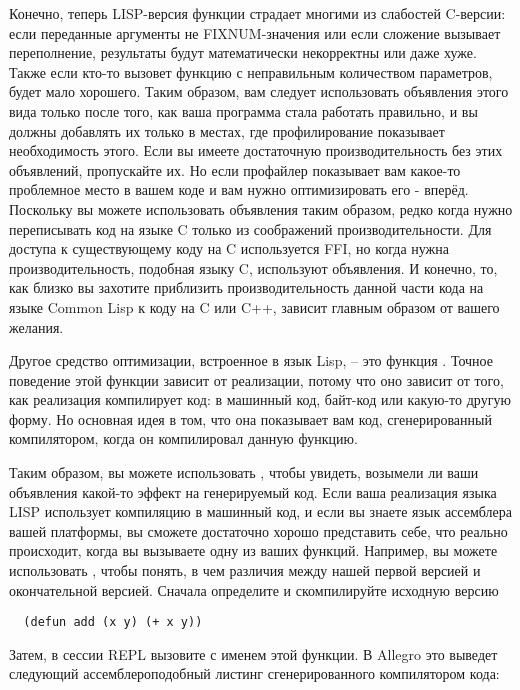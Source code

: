 Конечно, теперь LISP-версия функции страдает многими из слабостей C-версии: если
переданные аргументы не FIXNUM-значения или если сложение вызывает переполнение,
результаты будут математически некорректны или даже хуже. Также если кто-то вызовет
функцию  с неправильным количеством параметров, будет мало хорошего. Таким
образом, вам следует использовать объявления этого вида только после того, как ваша
программа стала работать правильно, и вы должны добавлять их только в местах, где
профилирование показывает необходимость этого. Если вы имеете достаточную
производительность без этих объявлений, пропускайте их. Но если профайлер показывает вам
какое-то проблемное место в вашем коде и вам нужно оптимизировать его - вперёд. Поскольку
вы можете использовать объявления таким образом, редко когда нужно переписывать код на
языке C только из соображений производительности. Для доступа к существующему коду на C
используется FFI, но когда нужна производительность, подобная языку C, используют
объявления. И конечно, то, как близко вы захотите приблизить производительность данной
части кода на языке Common Lisp к коду на C или C++, зависит главным образом от вашего
желания.

Другое средство оптимизации, встроенное в язык Lisp, -- это функция
. Точное поведение этой функции зависит от реализации, потому что оно
зависит от того, как реализация компилирует код: в машинный код, байт-код или какую-то
другую форму. Но основная идея в том, что она показывает вам код, сгенерированный
компилятором, когда он компилировал данную функцию.

Таким образом, вы можете использовать , чтобы увидеть, возымели ли ваши
объявления какой-то эффект на генерируемый код. Если ваша реализация языка LISP использует
компиляцию в машинный код, и если вы знаете язык ассемблера вашей платформы, вы сможете
достаточно хорошо представить себе, что реально происходит, когда вы вызываете одну из
ваших функций. Например, вы можете использовать , чтобы понять, в чем
различия между нашей первой версией  и окончательной версией. Сначала определите
и скомпилируйте исходную версию

\begin{lstlisting}
  (defun add (x y) (+ x y))
\end{lstlisting}

Затем, в сессии REPL вызовите  с именем этой функции. В Allegro это
выведет следующий ассемблероподобный листинг сгенерированного компилятором кода:

